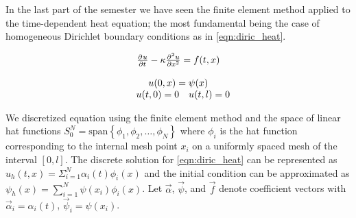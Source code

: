In the last part of the semester we have seen the finite element method applied to the time-dependent heat equation; the most fundamental being the case of homogeneous Dirichlet boundary conditions as in \eqref{eqn:diric_heat}.


%
\begin{align}
\begin{array}{rcl}
		 \multicolumn{3}{c}{  \pd{u}{t}{}   - \kappa \pd{u}{x}{2} = f(t,x)}\label{eqn:diric_heat}\\
		 &&\\
		   \multicolumn{3}{c}{u(0,x)  = \psi(x) } \\
		    & u(t,0)  =   0  &u(t,l)  = 0 
	\end{array}
\end{align}

We discretized equation using the finite element method and the space of linear hat functions $S_{0}^{N} = \text{span}\left\{\phi_{1}, \phi_{2}, \ldots, \phi_{N} \right\} $ where $\phi_{i}$ is the hat function corresponding to the internal mesh point $x_i$ on a uniformly spaced mesh of the interval $[0,l]$.  The discrete solution for \eqref{eqn:diric_heat} can be represented as $u_{h}(t,x) = \Sigma_{i=1}^{N} \alpha_{i}(t)\phi_{i}(x)$ and the initial condition can be approximated as $\psi_h(x) = \sum_{i=1}^{N} \psi(x_i) \phi_{i}(x)$.  Let $\vec{\alpha}$, $\vec{\psi}$, and $\vec{f}$ denote coefficient vectors with $\vec{\alpha}_{i} = \alpha_{i}(t)$, $\vec{\psi}_{i} = \psi(x_i)$.

